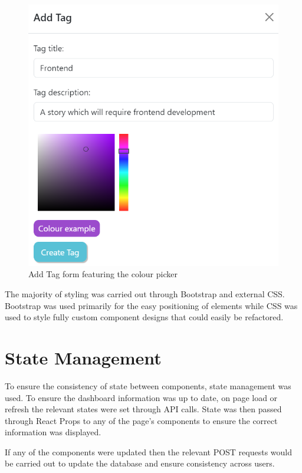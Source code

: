 \documentclass[l4proj.tex]{subfiles}
\begin{document}
\begin{figure}[h!]
\begin{center}
\includegraphics[scale=0.4]{dissertation/images/TagFormColourExample.png}
\caption{Add Tag form featuring the colour picker}
\label{fig:Tag form colour example} 
\end{center}
\end{figure}

The majority of styling was carried out through Bootstrap and external CSS. Bootstrap was used primarily for the easy positioning of elements while CSS was used to style fully custom component designs that could easily be refactored. 

\section{State Management}
To ensure the consistency of state between components, state management was used. To ensure the dashboard information was up to date, on page load or refresh the relevant states were set through API calls. State was then passed through React Props to any of the page's components to ensure the correct information was displayed. 

If any of the components were updated then the relevant POST requests would be carried out to update the database and ensure consistency across users.
\end{document}
